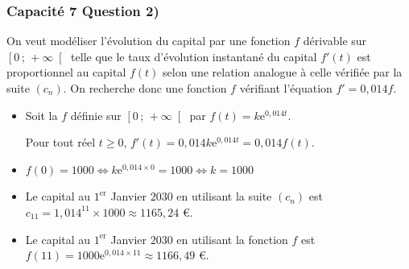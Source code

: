 \documentclass[11pt, hyperref={urlcolor=red,%
            linkcolor=blue, %
            colorlinks=true}]{beamer}
\newcommand{\Interfo}[2]{\left[#1\, ;\, #2\right[}
\newcommand{\suite}[1]{\ensuremath{\left(#1_{n}\right)}}
\begin{document}
\begin{frame}
\label{capacite7}
\frametitle{Capacité 7 Question 2)}


On veut modéliser l'évolution du capital par une fonction $f$ dérivable  sur $\Interfo{0}{+\infty}$ telle que le taux d'évolution instantané du capital $f'(t)$ est proportionnel au capital $f(t)$ selon une relation analogue à celle vérifiée par la suite $\suite{c}$. On recherche donc une fonction $f$ vérifiant l'équation $f'=0,014f$.   

\begin{itemize}
	\item Soit la $f$ définie sur $\Interfo{0}{+\infty}$ par $f(t)=k \text{e}^{0,014t}$.

Pour tout réel $t \geqslant 0$, $f'(t)=	0,014k \text{e}^{0,014t}=	0,014f(t)$.
	\item $f(0)=1000 \Leftrightarrow k \text{e}^{0,014\times 0 }=1000  \Leftrightarrow k=1000$
	
	\item Le capital au $1^{\text{er}}$ Janvier $2030$ en utilisant la suite $\suite{c}$  est $c_{11}=1,014^{11}\times 1000 \approx 1165,24$ €.
	
		\item Le capital au $1^{\text{er}}$ Janvier $2030$ en utilisant  la fonction $f$ est $f(11)=1000 \text{e}^{0,014\times 11} \approx 1166,49 $ €. 
	
\end{itemize}
\end{frame}

		
	
\end{document}
